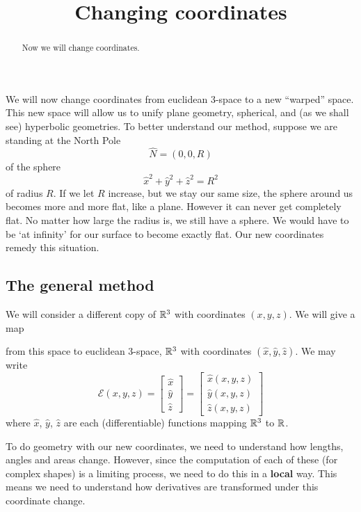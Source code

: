 \documentclass[newpage,hints,handout,12pt,noauthor,nooutcomes]{ximera}
\title{Changing coordinates}
\begin{document}
\begin{abstract}
Now we will change coordinates.
\end{abstract}
\maketitle




We will now change coordinates from euclidean $3$-space to a new
``warped'' space.  This new space will allow us to unify plane
geometry, spherical, and (as we shall see) hyperbolic geometries. To
better understand our method, suppose we are standing at the North Pole%
\[
\hat{N}=(0,0,R)
\]
of the sphere%
\[
\hat{x}^{2}+\hat{y}^{2}+\hat{z}^{2}=R^{2} %
\]
of radius $R$. If we let $R$ increase, but we stay our same size, the
sphere around us becomes more and more flat, like a plane. However it
can never get completely flat. No matter how large the radius is, we
still have a sphere.  We would have to be `at infinity' for our
surface to become exactly flat. Our new coordinates remedy this
situation.


\subsection{The general method}


We will consider a different copy of $\mathbb R^3$ with coordinates
$(x,y,z)$. We will give a map
\begin{center}
\end{center}
from this space to euclidean 3-space, $\mathbb R^3$ with coordinates $(\hat
x,\hat y,\hat z)$. We may write
\[
\mathcal{E}(x,y,z) = 
\begin{bmatrix}
\hat{x}  \\
\hat{y}  \\
\hat{z}  
\end{bmatrix}
=
\begin{bmatrix}
\hat{x}(x,y,z)  \\
\hat{y}(x,y,z)  \\
\hat{z}(x,y,z)  
\end{bmatrix}
\]
where $\hat x$, $\hat y$, $\hat z$ are each (differentiable) functions mapping
$\mathbb R^3$ to $\mathbb R$.


To do geometry with our new coordinates, we need to understand how
lengths, angles and areas change. However, since the computation of
each of these (for complex shapes) is a limiting process, we need to
do this in a \textbf{local} way. This means we need to understand how
derivatives are transformed under this coordinate change.
\end{document}
